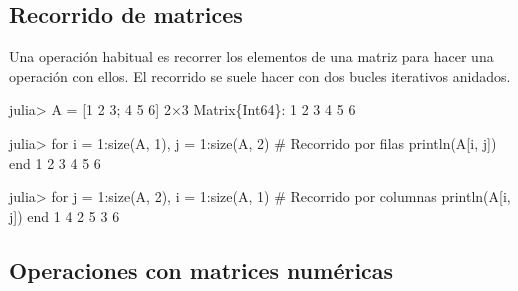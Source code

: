 \documentclass[
  letterpaper,
  DIV=11,
  numbers=noendperiod]{scrreprt}
\newenvironment{Shaded}{\begin{snugshade}}{\end{snugshade}}
\newcommand{\CommentTok}[1]{\textcolor[rgb]{0.37,0.37,0.37}{#1}}
\newcommand{\ControlFlowTok}[1]{\textcolor[rgb]{0.00,0.23,0.31}{#1}}
\newcommand{\DataTypeTok}[1]{\textcolor[rgb]{0.68,0.00,0.00}{#1}}
\newcommand{\FloatTok}[1]{\textcolor[rgb]{0.68,0.00,0.00}{#1}}
\newcommand{\FunctionTok}[1]{\textcolor[rgb]{0.28,0.35,0.67}{#1}}
\newcommand{\NormalTok}[1]{\textcolor[rgb]{0.00,0.23,0.31}{#1}}
\newcommand{\OperatorTok}[1]{\textcolor[rgb]{0.37,0.37,0.37}{#1}}
\begin{document}
\hypertarget{recorrido-de-matrices}{%
\subsection{Recorrido de matrices}\label{recorrido-de-matrices}}

Una operación habitual es recorrer los elementos de una matriz para
hacer una operación con ellos. El recorrido se suele hacer con dos
bucles iterativos anidados.

\begin{Shaded}
\begin{Highlighting}[]
\NormalTok{julia}\OperatorTok{\textgreater{}}\NormalTok{ A }\OperatorTok{=}\NormalTok{ [}\FloatTok{1} \FloatTok{2} \FloatTok{3}\NormalTok{; }\FloatTok{4} \FloatTok{5} \FloatTok{6}\NormalTok{]}
\FloatTok{2}\OperatorTok{×}\FloatTok{3} \DataTypeTok{Matrix}\NormalTok{\{}\DataTypeTok{Int64}\NormalTok{\}}\OperatorTok{:}
 \FloatTok{1}  \FloatTok{2}  \FloatTok{3}
 \FloatTok{4}  \FloatTok{5}  \FloatTok{6}

\NormalTok{julia}\OperatorTok{\textgreater{}} \ControlFlowTok{for}\NormalTok{ i }\OperatorTok{=} \FloatTok{1}\OperatorTok{:}\FunctionTok{size}\NormalTok{(A, }\FloatTok{1}\NormalTok{), j }\OperatorTok{=} \FloatTok{1}\OperatorTok{:}\FunctionTok{size}\NormalTok{(A, }\FloatTok{2}\NormalTok{)  }\CommentTok{\# Recorrido por filas}
         \FunctionTok{println}\NormalTok{(A[i, j])}
       \ControlFlowTok{end}
\FloatTok{1}
\FloatTok{2}
\FloatTok{3}
\FloatTok{4}
\FloatTok{5}
\FloatTok{6}

\NormalTok{julia}\OperatorTok{\textgreater{}} \ControlFlowTok{for}\NormalTok{ j }\OperatorTok{=} \FloatTok{1}\OperatorTok{:}\FunctionTok{size}\NormalTok{(A, }\FloatTok{2}\NormalTok{), i }\OperatorTok{=} \FloatTok{1}\OperatorTok{:}\FunctionTok{size}\NormalTok{(A, }\FloatTok{1}\NormalTok{)  }\CommentTok{\# Recorrido por columnas}
         \FunctionTok{println}\NormalTok{(A[i, j])}
       \ControlFlowTok{end}
\FloatTok{1}
\FloatTok{4}
\FloatTok{2}
\FloatTok{5}
\FloatTok{3}
\FloatTok{6}
\end{Highlighting}
\end{Shaded}

\hypertarget{operaciones-con-matrices-numuxe9ricas}{%
\subsection{Operaciones con matrices
numéricas}\label{operaciones-con-matrices-numuxe9ricas}}
\end{document}
